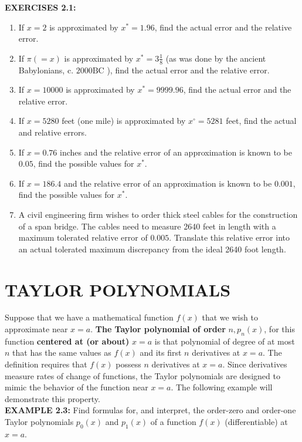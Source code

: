 \documentclass[../main.tex]{subfiles}
\begin{document}
\textbf{EXERCISES 2.1: }

\begin{enumerate}

\item If $x=2$ is approximated by $x^{*}=1.96$, find the actual error and the relative error.
\item If $\pi(=x)$ is approximated by $x^{*}=3 \frac{1}{8}$ (as was done by the ancient Babylonians, c. $2000 \mathrm{BC}$ ), find the actual error and the relative error.
\item If $x=10000$ is approximated by $x^{*}=9999.96$, find the actual error and the relative error.
\item If $x=5280$ feet (one mile) is approximated by $x^{\circ}=5281$ feet, find the actual and relative errors.
\item If $x=0.76$ inches and the relative error of an approximation is known to be $0.05$, find the possible values for $x^{*}$.
\item If $x=186.4$ and the relative error of an approximation is known to be $0.001$, find the possible values for $x^{*}$.
\item A civil engineering firm wishes to order thick steel cables for the construction of a span bridge. The cables need to measure 2640 feet in length with a maximum tolerated relative error of $0.005$. Translate this relative error into an actual tolerated maximum discrepancy from the ideal 2640 foot length.

\end{enumerate}

\section{TAYLOR POLYNOMIALS} \label{subsection}

Suppose that we have a mathematical function $f(x)$ that we wish to approximate near $x=a$. \textbf{The Taylor polynomial of order} $n, p_{n}(x)$, for this function \textbf{centered at (or about)} $x=a$ is that polynomial of degree of at most $n$ that has the same values as $f(x)$ and its first $n$ derivatives at $x=a$. The definition requires that $f(x)$ possess $n$ derivatives at $x=a$. Since derivatives measure rates of change of functions, the Taylor polynomials are designed to mimic the behavior of the function near $x=a$. The following example will demonstrate this property.\\

\textbf {EXAMPLE 2.3:} Find formulas for, and interpret, the order-zero and order-one Taylor polynomials $p_{0}(x)$ and $p_{1}(x)$ of a function $f(x)$ (differentiable) at $x=a$.\\
\end{document}
